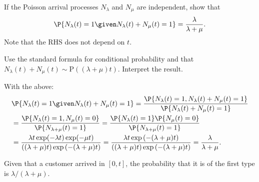 \begin{exercise}\label{ex:30a}
 If the Poisson arrival processes $N_\lambda$ and $N_\mu$ are independent, show that
 \begin{equation*}
 \P{N_\lambda(t) = 1 \given N_\lambda(t) + N_\mu(t) = 1} =
\frac{\lambda}{\lambda+\mu}.
 \end{equation*}
 Note that the RHS does not depend on $t$.
\begin{hint}
Use the standard formula for conditional probability and that $N_\lambda(t) + N_\mu(t) \sim \text{P}((\lambda + \mu)t)$. Interpret the result.
\end{hint}
\begin{solution}
 With the above:
 \begin{align*}
& \P{N_\lambda(t) = 1 \given N_\lambda(t) + N_\mu(t) = 1}
= \frac{\P{N_\lambda(t) = 1, N_\lambda(t) + N_\mu(t) = 1}}{\P{N_\lambda(t) + N_\mu(t) = 1}} \\
&= \frac{\P{N_\lambda(t) = 1, N_\mu(t) = 0}}{\P{N_{\lambda+\mu}(t) = 1}}
= \frac{\P{N_\lambda(t) = 1}\P{N_\mu(t) = 0}}{\P{N_{\lambda+\mu}(t) = 1}} \\
&= \frac{\lambda t \exp(-\lambda t) \exp(-\mu t)}{((\lambda+\mu)t)\exp{(-(\lambda+\mu)t)}}
= \frac{\lambda t \exp{(-(\lambda + \mu)t)}}{((\lambda+\mu)t)\exp{(-(\lambda+\mu)t)}}
= \frac{\lambda}{\lambda+\mu}.
 \end{align*}

 Given that a customer arrived in $[0,t]$, the probability that it is of the first type is $\lambda/(\lambda+\mu)$.
\end{solution}
\end{exercise}

